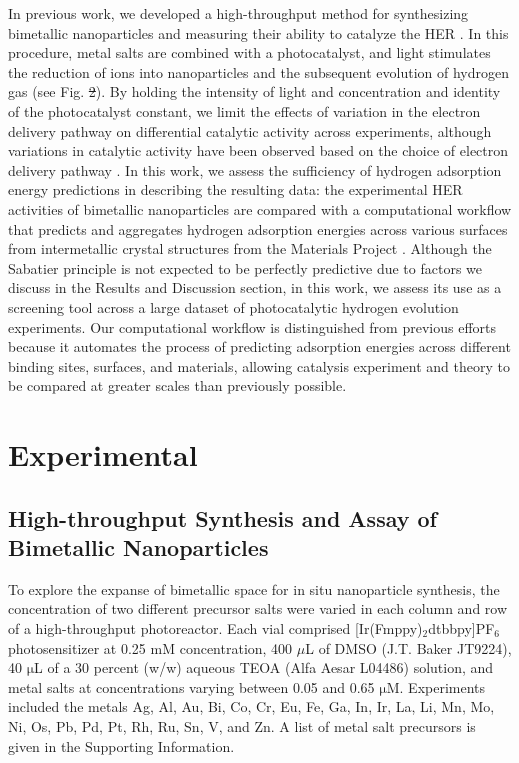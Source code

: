 \documentclass[preprint,12pt]{elsarticle}
\providecommand{\DIFadd}[1]{{\protect\color{blue}\uwave{#1}}} %
\providecommand{\DIFdel}[1]{{\protect\color{red}\sout{#1}}}                      %
\providecommand{\DIFaddbegin}{} %
\providecommand{\DIFaddend}{} %
\providecommand{\DIFdelbegin}{} %
\providecommand{\DIFdelend}{} %
\newcommand{\DIFscaledelfig}{0.5}
\newlength{\DIFdelgraphicswidth} %
\newlength{\DIFdelgraphicsheight} %
\newcommand{\DIFaddincludegraphics}[2][]{{\color{blue}\fbox{\DIFOincludegraphics[#1]{#2}}}} %
\newcommand{\DIFdelincludegraphics}[2][]{%
\sbox{\DIFdelgraphicsbox}{\DIFOincludegraphics[#1]{#2}}%
\settoboxwidth{\DIFdelgraphicswidth}{\DIFdelgraphicsbox} %
\settoboxtotalheight{\DIFdelgraphicsheight}{\DIFdelgraphicsbox} %
\scalebox{\DIFscaledelfig}{%
\parbox[b]{\DIFdelgraphicswidth}{\usebox{\DIFdelgraphicsbox}\\[-\baselineskip] \rule{\DIFdelgraphicswidth}{0em}}\llap{\resizebox{\DIFdelgraphicswidth}{\DIFdelgraphicsheight}{%
\setlength{\unitlength}{\DIFdelgraphicswidth}%
\begin{picture}(1,1)%
\thicklines\linethickness{2pt} %
{\color[rgb]{1,0,0}\put(0,0){\framebox(1,1){}}}%
{\color[rgb]{1,0,0}\put(0,0){\line( 1,1){1}}}%
{\color[rgb]{1,0,0}\put(0,1){\line(1,-1){1}}}%
\end{picture}%
}\hspace*{3pt}}} %
} %
\DeclareRobustCommand{\DIFaddbegin}{\DIFOaddbegin \let\includegraphics\DIFaddincludegraphics} %
\DeclareRobustCommand{\DIFaddend}{\DIFOaddend \let\includegraphics\DIFOincludegraphics} %
\DeclareRobustCommand{\DIFdelbegin}{\DIFOdelbegin \let\includegraphics\DIFdelincludegraphics} %
\DeclareRobustCommand{\DIFdelend}{\DIFOaddend \let\includegraphics\DIFOincludegraphics} %
\begin{document}
 
In previous work, we developed a high-throughput method for synthesizing bimetallic nanoparticles and measuring their ability to catalyze the HER \cite{lopato2020parallelized,bhat2022accelerated,simon2022ligand}. In this procedure, metal salts are combined with a photocatalyst, and light stimulates the reduction of ions into nanoparticles and the subsequent evolution of hydrogen gas (see Fig. \DIFdelbegin \DIFdel{2}\DIFdelend \DIFaddbegin \DIFadd{\ref{figure_2}}\DIFaddend ). By holding the intensity of light and concentration and identity of the photocatalyst constant, we limit the effects of variation in the electron delivery pathway on differential catalytic activity across experiments, although variations in catalytic activity have been observed based on the choice of electron delivery pathway \cite{pokhrel2015best}. In this work, we assess the sufficiency of hydrogen adsorption energy predictions in describing the resulting data: the experimental HER activities of bimetallic nanoparticles are compared with a computational workflow that predicts and aggregates hydrogen adsorption energies across various surfaces from intermetallic crystal structures from the Materials Project \cite{ong2013python}. Although the Sabatier principle is not expected to be perfectly predictive due to factors we discuss in the Results and Discussion section, in this work, we assess its use as a screening tool across a large dataset of photocatalytic hydrogen evolution experiments. Our computational workflow is distinguished from previous efforts because it automates the process of predicting adsorption energies across different binding sites, surfaces, and materials, allowing catalysis experiment and theory to be compared at greater scales than previously possible.

\section{Experimental}\label{Section:Experimental}
\subsection{High-throughput Synthesis and Assay of Bimetallic Nanoparticles}
To explore the expanse of bimetallic space for in situ nanoparticle synthesis, the concentration of two different precursor salts were varied in each column and row of a high-throughput photoreactor. Each vial comprised [Ir(Fmppy)$_2$dtbbpy]PF$_6$ photosensitizer at 0.25 mM concentration, 400 $\mu$L of DMSO (J.T. Baker JT9224), 40 $\mathrm{\mu}$L of a 30 percent (w/w) aqueous TEOA (Alfa Aesar L04486) solution, and metal salts at concentrations varying between 0.05 and 0.65 $\mathrm{\mu}$M. Experiments included the metals Ag, Al, Au, Bi, Co, Cr, Eu, Fe, Ga, In, Ir, La, Li, Mn, Mo, Ni, Os, Pb, Pd, Pt, Rh, Ru, Sn, V, and Zn. A list of metal salt precursors is given in the Supporting Information.
\end{document}
